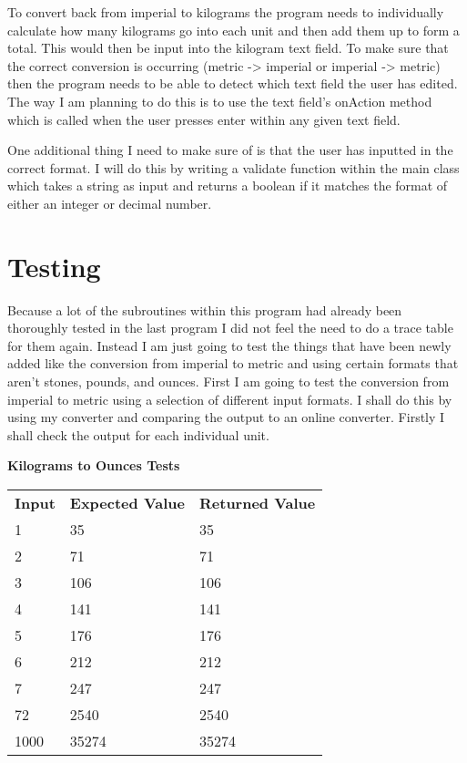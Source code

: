 \documentclass[a4paper]{article}
\begin{document}
To convert back from imperial to kilograms the program needs to individually calculate how many kilograms go into each unit and then add them up to 
form a total. This would then be input into the kilogram text field. To make sure that the correct conversion is occurring (metric -> imperial or 
imperial -> metric) then the program needs to be able to detect which text field the user has edited. The way I am planning to do this is to use the 
text field's onAction method which is called when the user presses enter within any given text field.

One additional thing I need to make sure of is that the user has inputted in the correct format. I will do this by writing a validate function within 
the main class which takes a string as input and returns a boolean if it matches the format of either an integer or decimal number.

\section*{Testing}

Because a lot of the subroutines within this program had already been thoroughly tested in the last program I did not feel the need to do a trace 
table for them again. Instead I am just going to test the things that have been newly added like the conversion from imperial to metric and using 
certain formats that aren't stones, pounds, and ounces. First I am going to test the conversion from imperial to metric using a selection of different 
input formats. I shall do this by using my converter and comparing the output to an online converter. Firstly I shall check the output for each individual unit.

\noindent \textbf{Kilograms to Ounces Tests}
\begin{table}[H]
\begin{tabular}{lll}
\textbf{Input} & \textbf{Expected Value} & \textbf{Returned Value} \\
1              & 35                      & 35                      \\
2              & 71                      & 71                      \\
3              & 106                     & 106                     \\
4              & 141                     & 141                     \\
5              & 176                     & 176                     \\
6              & 212                     & 212                     \\
7              & 247                     & 247                     \\
72             & 2540                    & 2540                    \\
1000           & 35274                   & 35274                  
\end{tabular}
\end{table}
\end{document}
